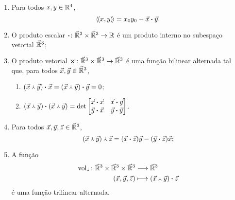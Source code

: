 \begin{exercise}
	\begin{enumerate}
	\item Para todos $x,y \in \mathbb{R}^4$,
		\begin{equation*}
		\left\langle\!\left\langle{x},{y}\right\rangle\!\right\rangle = {x}_0{y}_0-{\vec{x}} \bm{\cdot} {\vec{y}}.
		\end{equation*}

	\item O produto escalar $\bm{\cdot}\colon \vec{\mathbb{R}}^3 \times \vec{\mathbb{R}}^3 \to \mathbb{R}$ é um produto interno no subespaço vetorial $\vec{\mathbb{R}}^3$;
	
	\item O produto vetorial $\bm{\times}\colon \vec{\mathbb{R}}^3 \times \vec{\mathbb{R}}^3 \to \vec{\mathbb{R}}^3$ é uma função bilinear alternada tal que, para todos $\vec{x},\vec{y} \in \vec{\mathbb{R}}^3$,
		\begin{enumerate}
		\item ${({\vec{x}} \Yup {\vec{y}})} \bm{\cdot} {\vec{x}} = {({\vec{x}} \Yup {\vec{y}})} \bm{\cdot} {\vec{y}} = 0$;
		
		\item ${({\vec{x}} \Yup {\vec{y}})} \bm{\cdot} {({\vec{x}} \Yup {\vec{y}})} = \det
				\begin{bmatrix}
				{\vec{x}} \bm{\cdot} {\vec{x}} & {\vec{x}} \bm{\cdot} {\vec{y}} \\
				{\vec{y}} \bm{\cdot} {\vec{x}} & {\vec{y}} \bm{\cdot} {\vec{y}}
				\end{bmatrix}$.
		\end{enumerate}
	
	\item Para todos $\vec{x},\vec{y},\vec{z} \in \vec{\mathbb{R}}^3$,
		\begin{equation*}
		{({\vec{x}} \Yup {\vec{y}})} \Yup {\vec{z}} = ({\vec{x}} \bm{\cdot} {\vec{z}})\vec{y} - ({\vec{y}} \bm{\cdot} {\vec{z}})\vec{x};
		\end{equation*}
	
	\item A função
		\begin{align*}
		{\operatorname{vol}_{\Yup}}\colon {\vec{\mathbb{R}}^3 \times \vec{\mathbb{R}}^3 \times \vec{\mathbb{R}}^3} &\longrightarrow {\vec{\mathbb{R}}^3} \\{(\vec{x},\vec{y},\vec{z})} &\longmapsto {({\vec{x}} \Yup {\vec{y}})} \bm{\cdot} {\vec{z}}
		\end{align*}
é uma função trilinear alternada.

	\end{enumerate}
\end{exercise}


